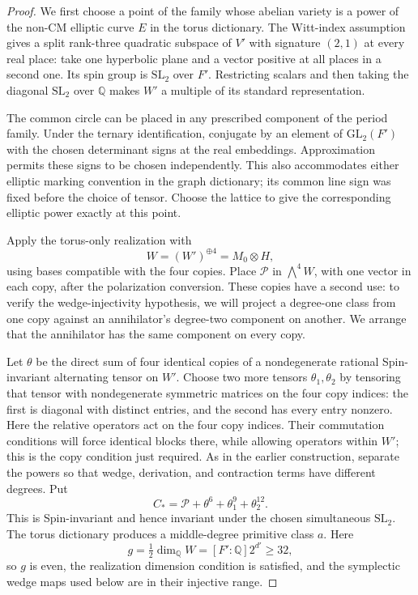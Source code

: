 \documentclass[11pt]{article}
\numberwithin{equation}{section}
\theoremstyle{definition}
\theoremstyle{remark}
\begin{document}
\begin{proof}
We first choose a point of the family whose abelian
variety is a power of the non-CM elliptic curve $E$
in the torus dictionary.  The Witt-index assumption
gives a split rank-three quadratic subspace of $V'$
with signature $(2,1)$ at every real place: take one
hyperbolic plane and a vector positive at all places
in a second one.  Its spin group is $\mathrm{SL}_2$
over $F'$.  Restricting scalars and then taking the
diagonal $\mathrm{SL}_2$ over $\mathbb Q$ makes $W'$ a
multiple of its standard representation.

The common circle can be placed in any prescribed
component of the period family.  Under the ternary
identification, conjugate by an element of
$\mathrm{GL}_2(F')$ with the chosen determinant signs
at the real embeddings.  Approximation permits these
signs to be chosen independently.  This also accommodates
either elliptic marking convention in the graph
dictionary; its common line sign was fixed before the
choice of tensor.  Choose the lattice to give the
corresponding elliptic power exactly at this point.

Apply the torus-only realization with
\[
 W=(W')^{\oplus4}=M_0\otimes H,
\]
using bases compatible with the four copies.  Place
$\mathcal P$ in $\bigwedge^4W$, with one vector in
each copy, after the polarization conversion.  These copies
have a second use: to verify the wedge-injectivity hypothesis,
we will project a degree-one class from one copy against an
annihilator's degree-two component on another.  We arrange
that the annihilator has the same component on every copy.

Let
$\theta$ be the direct sum of four identical copies
of a nondegenerate rational Spin-invariant alternating
tensor on $W'$.  Choose two more tensors
$\theta_1,\theta_2$ by tensoring that tensor with
nondegenerate symmetric matrices on the four copy
indices: the first is diagonal with distinct entries,
and the second has every entry nonzero.  Here the relative
operators act on the four copy indices.  Their commutation
conditions will force identical blocks there, while allowing
operators within $W'$; this is the copy condition just required.
As in the earlier construction, separate the powers so that
wedge, derivation, and contraction terms have different degrees.
Put
\begin{equation}
 \label{aux:test-tensor}
 C_* =\mathcal P+\theta^6+\theta_1^9+\theta_2^{12}.
\end{equation}
This is Spin-invariant and hence invariant under the
chosen simultaneous $\mathrm{SL}_2$.  The torus
dictionary produces a middle-degree primitive class
$a$.  Here
\[
 g=\tfrac12\dim_{\mathbb Q}W=[F':\mathbb Q]2^{d'}\ge32,
\]
so $g$ is even, the realization dimension condition is
satisfied, and the symplectic wedge maps used below
are in their injective range.


\end{proof}
\end{document}
